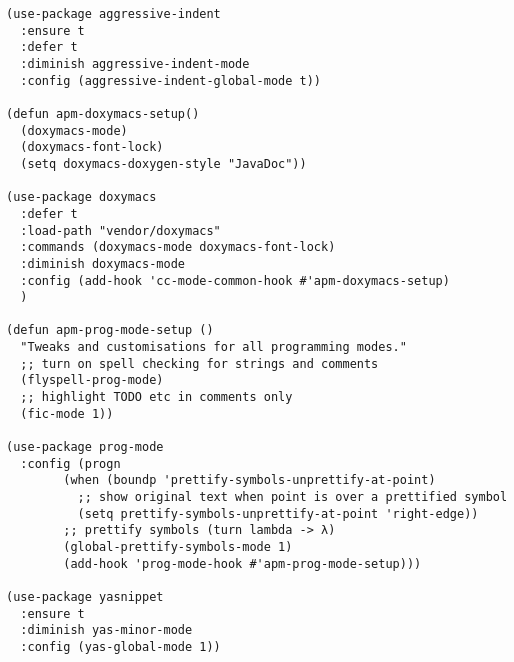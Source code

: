 \documentclass[11pt]{article}
\begin{document}
\begin{verbatim}
(use-package aggressive-indent
  :ensure t
  :defer t
  :diminish aggressive-indent-mode
  :config (aggressive-indent-global-mode t))

(defun apm-doxymacs-setup()
  (doxymacs-mode)
  (doxymacs-font-lock)
  (setq doxymacs-doxygen-style "JavaDoc"))

(use-package doxymacs
  :defer t
  :load-path "vendor/doxymacs"
  :commands (doxymacs-mode doxymacs-font-lock)
  :diminish doxymacs-mode
  :config (add-hook 'cc-mode-common-hook #'apm-doxymacs-setup)
  )

(defun apm-prog-mode-setup ()
  "Tweaks and customisations for all programming modes."
  ;; turn on spell checking for strings and comments
  (flyspell-prog-mode)
  ;; highlight TODO etc in comments only
  (fic-mode 1))

(use-package prog-mode
  :config (progn
	    (when (boundp 'prettify-symbols-unprettify-at-point)
	      ;; show original text when point is over a prettified symbol
	      (setq prettify-symbols-unprettify-at-point 'right-edge))
	    ;; prettify symbols (turn lambda -> λ)
	    (global-prettify-symbols-mode 1)
	    (add-hook 'prog-mode-hook #'apm-prog-mode-setup)))

(use-package yasnippet
  :ensure t
  :diminish yas-minor-mode
  :config (yas-global-mode 1))
\end{verbatim}
\end{document}
